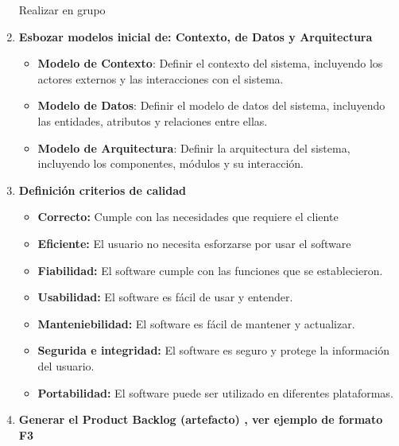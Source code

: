 \begin{doublespace}
\begin{enumerate}[label=\alph*)]
\begin{enumerate}
    \end{enumerate}

    Realizar en grupo
    \item \large\textbf{Esbozar modelos inicial de: Contexto, de Datos y Arquitectura}
        \begin{itemize}
            \item \textbf{Modelo de Contexto}: Definir el contexto del sistema, incluyendo los actores externos y las interacciones con el sistema.
            \item \textbf{Modelo de Datos}: Definir el modelo de datos del sistema, incluyendo las entidades, atributos y relaciones entre ellas.
            \item \textbf{Modelo de Arquitectura}: Definir la arquitectura del sistema, incluyendo los componentes, módulos y su interacción.
        \end{itemize}

    \item \large\textbf{Definición criterios de calidad}
    \begin{itemize}
        
        \item \textbf{Correcto:} Cumple con las necesidades que requiere el cliente\par
        \item \textbf{Eficiente:} El usuario no necesita esforzarse por usar el software
        \item \textbf{Fiabilidad:} El software cumple con las funciones que se establecieron.
        \item \textbf{Usabilidad:} El software es fácil de usar y entender.
        \item \textbf{Manteniebilidad:} El software es fácil de mantener y actualizar.
        \item \textbf{Segurida e integridad:} El software es seguro y protege la información del usuario.
        \item \textbf{Portabilidad:} El software puede ser utilizado en diferentes plataformas.

    \end{itemize}


\newpage

\item \large\textbf{Generar el Product Backlog (artefacto) , ver ejemplo de formato F3}


\end{enumerate}
\end{doublespace}
